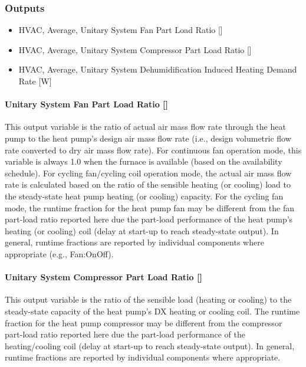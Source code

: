 \subsubsection{Outputs}\label{outputs-2-024}

\begin{itemize}
\item
  HVAC, Average, Unitary System Fan Part Load Ratio {[]}
\item
  HVAC, Average, Unitary System Compressor Part Load Ratio {[]}
\item
  HVAC, Average, Unitary System Dehumidification Induced Heating Demand Rate {[}W{]}
\end{itemize}

\paragraph{Unitary System Fan Part Load Ratio {[]}}\label{unitary-system-fan-part-load-ratio-3}

This output variable is the ratio of actual air mass flow rate through the heat pump to the heat pump's design air mass flow rate (i.e., design volumetric flow rate converted to dry air mass flow rate). For continuous fan operation mode, this variable is always 1.0 when the furnace is available (based on the availability schedule). For cycling fan/cycling coil operation mode, the actual air mass flow rate is calculated based on the ratio of the sensible heating (or cooling) load to the steady-state heat pump heating (or cooling) capacity. For the cycling fan mode, the runtime fraction for the heat pump fan may be different from the fan part-load ratio reported here due the part-load performance of the heat pump's heating (or cooling) coil (delay at start-up to reach steady-state output). In general, runtime fractions are reported by individual components where appropriate (e.g., Fan:OnOff).

\paragraph{Unitary System Compressor Part Load Ratio {[]}}\label{unitary-system-compressor-part-load-ratio-2}

This output variable is the ratio of the sensible load (heating or cooling) to the steady-state capacity of the heat pump's DX heating or cooling coil. The runtime fraction for the heat pump compressor may be different from the compressor part-load ratio reported here due the part-load performance of the heating/cooling coil (delay at start-up to reach steady-state output). In general, runtime fractions are reported by individual components where appropriate.

